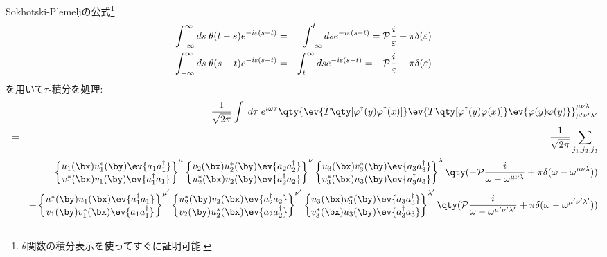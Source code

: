 \documentclass[10.5pt,a4paper]{jreport}
\begin{document}
Sokhotski-Plemeljの公式\footnote{$\theta$関数の積分表示を使ってすぐに証明可能.}
\begin{eqnarray}
  \int_{-\infty}^\infty ds\; \theta(t-s)e^{-i\varepsilon(s-t)} &=& \int_{-\infty}^t ds e^{-i\varepsilon(s-t)} = {\cal P}\frac{i}{\varepsilon} + \pi\delta(\varepsilon)\\
  \int_{-\infty}^\infty ds\; \theta(s-t)e^{-i\varepsilon(s-t)} &=& \int_{t}^{\infty} ds e^{-i\varepsilon(s-t)} = -{\cal P}\frac{i}{\varepsilon} + \pi\delta(\varepsilon)
\end{eqnarray}
を用いて$\tau$-積分を処理:
\begin{eqnarray}
  &&\frac{1}{\sqrt{2\pi}}\int\; d\tau\;e^{i\omega\tau}  \qty{\ev{T\qty[\varphi^\dagger(y)\varphi^\dagger(x)]}\ev{T\qty[\varphi^\dagger(y)\varphi(x)]}\ev{\varphi(y)\varphi(y)}}^{\mu\nu\lambda}_{\mu'\nu'\lambda'}\\
\nonumber  &=& \frac{1}{\sqrt{2\pi}}\sum_{j_1, j_2, j_3}\\
\nonumber  && \begin{Bmatrix}
    u_{1}(\bx)u_{1}^*(\by)\ev{a_{1}a_{1}^\dagger}\\
    v_{1}^*(\bx)v_{1}(\by)\ev{a_{1}^\dagger a_{1}}
  \end{Bmatrix}^\mu
\begin{Bmatrix}
      v_{2}(\bx)u^*_{2}(\by)\ev{a_{2}a_{2}^\dagger}\\
    u^*_{2}(\bx)v_{2}(\by)\ev{a_{2}^\dagger a_{2}}
  \end{Bmatrix}^\nu
  \begin{Bmatrix}
    u_{3}(\bx)v^*_{3}(\by)\ev{a_{3}a^\dagger_{3}}\\
    v_{3}^*(\bx)u_{3}(\by)\ev{a_{3}^\dagger a_{3}}
  \end{Bmatrix}^\lambda \qty(-{\cal P}\frac{i}{\omega - \omega^{\mu\nu\lambda}} + \pi\delta(\omega - \omega^{\mu\nu\lambda}))\\
  \nonumber  &&+\begin{Bmatrix}
    u_{1}^*(\by)u_{1}(\bx)\ev{a_{1}^\dagger a_{1}}\\
    v_{1}(\by)v_{1}^*(\bx)\ev{a_{1}a_{1}^\dagger}
  \end{Bmatrix}^{\mu'}
  \begin{Bmatrix}
    u^*_{2}(\by)v_{2}(\bx)\ev{a_{2}^\dagger a_{2}}\\
    v_{2}(\by)u^*_{2}(\bx)\ev{a_{2}a_{2}^\dagger}
  \end{Bmatrix}^{\nu'}
  \begin{Bmatrix}
    u_{3}(\bx)v^*_{3}(\by)\ev{a_{3}a^\dagger_{3}}\\
    v_{3}^*(\bx)u_{3}(\by)\ev{a_{3}^\dagger a_{3}}
  \end{Bmatrix}^{\lambda'}\qty({\cal P}\frac{i}{\omega - \omega^{\mu'\nu'\lambda'}} + \pi\delta(\omega - \omega^{\mu'\nu'\lambda'}))\\
\end{eqnarray}
\end{document}
